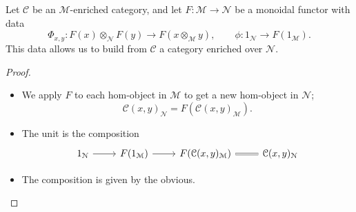 \documentclass[main.tex]{subfiles}
\begin{document}
\begin{lemma}
  \label{lemma:monoidal_functor_switches_enrichment}
  Let $\mathcal{C}$ be an $\mathcal{M}$-enriched category, and let $F\colon \mathcal{M} \to \mathcal{N}$ be a monoidal functor with data
  \begin{equation*}
    \Phi_{x, y}\colon F(x) \otimes_{\mathcal{N}} F(y) \to F(x \otimes_{\mathcal{M}} y),\qquad \phi\colon 1_{\mathcal{N}} \to F(1_{\mathcal{M}}).
  \end{equation*}
  This data allows us to build from $\mathcal{C}$ a category enriched over $\mathcal{N}$.
\end{lemma}
\begin{proof}
  \leavevmode
  \begin{itemize}
    \item We apply $F$ to each hom-object in $\mathcal{M}$ to get a new hom-object in $\mathcal{N}$;
      \begin{equation*}
        \mathcal{C}(x, y)_{\mathcal{N}} = F(\mathcal{C}(x, y)_{\mathcal{M}}).
      \end{equation*}

    \item The unit is the composition
      \begin{equation*}
        \begin{tikzcd}
          1_{\mathcal{N}}
          \arrow[r]
          & F(1_{\mathcal{M}})
          \arrow[r]
          & F(\mathcal{C}(x, y)_{\mathcal{M}})
          \arrow[r, equals]
          & \mathcal{C}(x, y)_{\mathcal{N}}
        \end{tikzcd}
      \end{equation*}

    \item The composition is given by the obvious.
  \end{itemize}
\end{proof}
\end{document}
